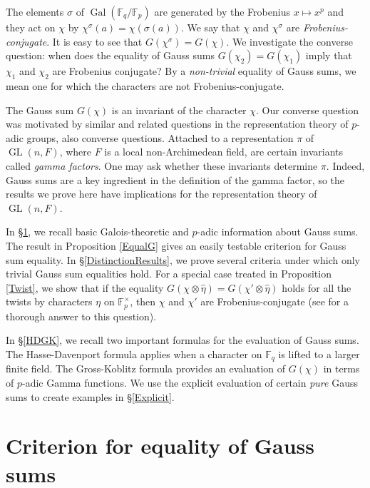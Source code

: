 \documentclass[12pt]{amsart}  \usepackage{amsmath,amssymb,enumerate,amscd,tikz,url}
\numberwithin{equation}{section}
\theoremstyle{definition}
\newcommand{\F}{{\mathbb F}}
\newcommand{\Gal}{\operatorname{Gal}}
\newcommand{\GL}{\operatorname{GL}}
\begin{document}
The elements $\sigma$ of $\Gal(\F_q /\F_p)$ are generated by the Frobenius $x \mapsto x^p$ and they act on $\chi$ by $\chi^{\sigma}(a) = \chi(\sigma(a))$.  We say that $\chi$ and $\chi^{\sigma}$ are {\em Frobenius-conjugate}.  It is easy to see that $G(\chi^\sigma) = G(\chi)$.   We investigate the converse question:  when does the equality of Gauss sums $G(\chi_2) = G(\chi_1)$ imply that $\chi_1$ and $\chi_2$ are Frobenius conjugate?  By a {\em non-trivial} equality of Gauss sums, we mean one for which the characters are not Frobenius-conjugate.

The Gauss sum $G(\chi)$ is an invariant of the character $\chi$.  Our converse question was motivated by similar and related questions in the representation theory of $p$-adic groups, also converse questions.  Attached to a representation $\pi$ of $\GL(n,F)$, where $F$ is a local non-Archimedean field, are certain invariants called \emph{gamma factors}.  One may ask whether these invariants determine $\pi$.  Indeed, Gauss sums are a key ingredient in the definition of the gamma factor, so the results we prove here  have implications for the representation theory of $\GL(n,F)$.

In \S\ref{Criterion}, we recall basic Galois-theoretic and $p$-adic information about Gauss sums.  The result in Proposition \ref{EqualG} gives an easily testable criterion for Gauss sum equality.  In \S\ref{DistinctionResults}, we prove several criteria under which only trivial Gauss sum equalities hold.   For a special case treated in Proposition \ref{Twist}, we show that if the equality $G(\chi \otimes \widehat{\eta}) = G(\chi' \otimes \widehat{\eta})$ holds for all the twists by characters $\eta$ on $\F_p^\times$, then $\chi$ and $\chi'$ are Frobenius-conjugate (see \cite{NZY} for a thorough answer to this question).

In \S \ref{HDGK}, we recall two important formulas for the evaluation of Gauss sums.  The Hasse-Davenport formula applies when a character on $\F_q$ is lifted to a larger finite field.  The Gross-Koblitz formula provides an evaluation of $G(\chi)$ in terms of $p$-adic Gamma functions.  We use the explicit evaluation of certain {\em pure} Gauss sums \cite[Cor. 8]{Ev} to create examples in \S \ref{Explicit}.

\section{Criterion for equality of Gauss sums} \label{Criterion}
\end{document}

